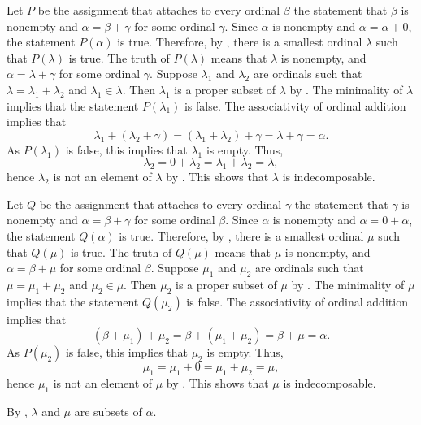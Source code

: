 \documentclass{article}
\begin{document}
\begin{solution}[\ref{exe:vmlhobjb}]
  \label{sol:cec8sl16}
  Let \(P\) be the assignment that attaches to every ordinal \(\beta\)
  the statement that \(\beta\) is nonempty and
  \(\alpha = \beta + \gamma\) for some ordinal \(\gamma\).  Since
  \(\alpha\) is nonempty and \(\alpha = \alpha + 0\), the statement
  \(P(\alpha)\) is true.  Therefore, by , there is
  a smallest ordinal \(\lambda\) such that \(P(\lambda)\) is true.
  The truth of \(P(\lambda)\) means that \(\lambda\) is nonempty, and
  \(\alpha = \lambda + \gamma\) for some ordinal \(\gamma\).  Suppose
  \(\lambda_1\) and \(\lambda_2\) are ordinals such that
  \(\lambda = \lambda_1 + \lambda_2\) and \(\lambda_1 \in \lambda\).
  Then \(\lambda_1\) is a proper subset of \(\lambda\) by
  .  The minimality of \(\lambda\) implies that the
  statement \(P(\lambda_1)\) is false.  The associativity of ordinal
  addition implies that
  \begin{displaymath}
    \lambda_1 + (\lambda_2 + \gamma) =
    (\lambda_1 + \lambda_2) + \gamma =
    \lambda + \gamma = \alpha.
  \end{displaymath}
  As \(P(\lambda_1)\) is false, this implies that \(\lambda_1\) is
  empty.  Thus,
  \begin{displaymath}
    \lambda_2 = 0 + \lambda_2 = \lambda_1 + \lambda_2 = \lambda,
  \end{displaymath}
  hence \(\lambda_2\) is not an element of \(\lambda\) by
  .  This shows that \(\lambda\) is indecomposable.
  
  Let \(Q\) be the assignment that attaches to every ordinal
  \(\gamma\) the statement that \(\gamma\) is nonempty and
  \(\alpha = \beta + \gamma\) for some ordinal \(\beta\).  Since
  \(\alpha\) is nonempty and \(\alpha = 0 + \alpha\), the statement
  \(Q(\alpha)\) is true.  Therefore, by , there is
  a smallest ordinal \(\mu\) such that \(Q(\mu)\) is true.  The truth
  of \(Q(\mu)\) means that \(\mu\) is nonempty, and
  \(\alpha = \beta + \mu\) for some ordinal \(\beta\).  Suppose
  \(\mu_1\) and \(\mu_2\) are ordinals such that
  \(\mu = \mu_1 + \mu_2\) and \(\mu_2 \in \mu\).  Then \(\mu_2\) is a
  proper subset of \(\mu\) by .  The minimality of
  \(\mu\) implies that the statement \(Q(\mu_2)\) is false.  The
  associativity of ordinal addition implies that
  \begin{displaymath}
    (\beta + \mu_1) + \mu_2 =
    \beta + (\mu_1 + \mu_2) =
    \beta + \mu = \alpha.
  \end{displaymath}
  As \(P(\mu_2)\) is false, this implies that \(\mu_2\) is empty.
  Thus,
  \begin{displaymath}
    \mu_1 = \mu_1 + 0 = \mu_1 + \mu_2 = \mu,
  \end{displaymath}
  hence \(\mu_1\) is not an element of \(\mu\) by .
  This shows that \(\mu\) is indecomposable.

  By , \(\lambda\) and \(\mu\) are subsets of
  \(\alpha\).
\end{solution}
\end{document}
